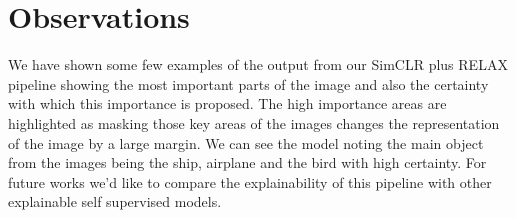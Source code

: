 \section{Observations}
\label{sec:observations}

We have shown some few examples of the output from our SimCLR plus RELAX pipeline showing the most important parts of the image and also the certainty with which this importance is proposed. The high importance areas are highlighted as masking those key areas of the images changes the representation of the image by a large margin. We can see the model noting the main object from the images being the ship, airplane and the bird with high certainty. For future works we'd like to compare the explainability of this pipeline with other explainable self supervised models.

